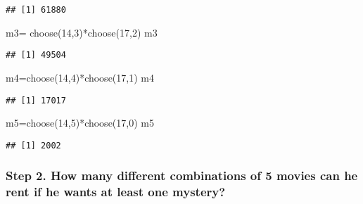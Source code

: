 \documentclass[
]{article}
\newenvironment{Shaded}{\begin{snugshade}}{\end{snugshade}}
\newcommand{\DecValTok}[1]{\textcolor[rgb]{0.00,0.00,0.81}{#1}}
\newcommand{\FunctionTok}[1]{\textcolor[rgb]{0.00,0.00,0.00}{#1}}
\newcommand{\NormalTok}[1]{#1}
\newcommand{\OtherTok}[1]{\textcolor[rgb]{0.56,0.35,0.01}{#1}}
\newcommand{\SpecialCharTok}[1]{\textcolor[rgb]{0.00,0.00,0.00}{#1}}
\begin{document}
\begin{verbatim}
## [1] 61880
\end{verbatim}

\begin{Shaded}
\begin{Highlighting}[]
\NormalTok{m3}\OtherTok{=} \FunctionTok{choose}\NormalTok{(}\DecValTok{14}\NormalTok{,}\DecValTok{3}\NormalTok{)}\SpecialCharTok{*}\FunctionTok{choose}\NormalTok{(}\DecValTok{17}\NormalTok{,}\DecValTok{2}\NormalTok{)}
\NormalTok{m3}
\end{Highlighting}
\end{Shaded}

\begin{verbatim}
## [1] 49504
\end{verbatim}

\begin{Shaded}
\begin{Highlighting}[]
\NormalTok{m4}\OtherTok{=}\FunctionTok{choose}\NormalTok{(}\DecValTok{14}\NormalTok{,}\DecValTok{4}\NormalTok{)}\SpecialCharTok{*}\FunctionTok{choose}\NormalTok{(}\DecValTok{17}\NormalTok{,}\DecValTok{1}\NormalTok{)}
\NormalTok{m4}
\end{Highlighting}
\end{Shaded}

\begin{verbatim}
## [1] 17017
\end{verbatim}

\begin{Shaded}
\begin{Highlighting}[]
\NormalTok{m5}\OtherTok{=}\FunctionTok{choose}\NormalTok{(}\DecValTok{14}\NormalTok{,}\DecValTok{5}\NormalTok{)}\SpecialCharTok{*}\FunctionTok{choose}\NormalTok{(}\DecValTok{17}\NormalTok{,}\DecValTok{0}\NormalTok{)}
\NormalTok{m5}
\end{Highlighting}
\end{Shaded}

\begin{verbatim}
## [1] 2002
\end{verbatim}

\hypertarget{step-2.-how-many-different-combinations-of-5-movies-can-he-rent-if-he-wants-at-least-one-mystery}{%
\subsubsection{Step 2. How many different combinations of 5 movies can
he rent if he wants at least one
mystery?}\label{step-2.-how-many-different-combinations-of-5-movies-can-he-rent-if-he-wants-at-least-one-mystery}}
\end{document}
